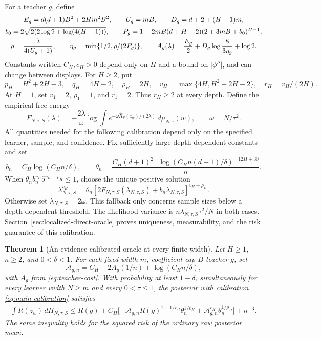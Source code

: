 \documentclass[11pt]{article}
\newtheorem{theorem}{Theorem}[section]\newtheorem{lemma}[theorem]{Lemma}\newtheorem{corollary}[theorem]{Corollary}\newtheorem{proposition}[theorem]{Proposition}
\theoremstyle{remark}\newtheorem{remark}[theorem]{Remark}
\begin{document}
For a teacher $g$, define
\begin{gather}
 E_g=d(d+1)B^2+2Hm^2B^2,\qquad U_g=mB,\qquad D_g=d+2+(H-1)m,\notag\\
 b_0=2\sqrt{2(2\log9+\log(4(H+1)))},\qquad
 P_g=1+2mB(d+H+2)(2+3mB+b_0)^{H-1},\notag\\
 \rho=\frac{\lambda}{4(U_g+1)},\qquad
 \eta_g=\min\{1/2,\rho/(2P_g)\},\qquad
 A_g(\lambda)=\frac{E_g}{2}+D_g\log\frac{8}{3\eta_g}+\log2.
 \label{eq:teacher-cost}
\end{gather}
Constants written $C_H,c_H>0$ depend only on $H$ and a bound on $|\phi''|$, and can change between displays. For $H\ge2$, put
\[
 p_H=H^2+2H-3,\quad q_H=4H-2,\quad
 \rho_H=2H,\quad v_H=\max\{4H,H^2+2H-2\},\quad r_H=v_H/(2H).
\]
At $H=1$, set $v_1=2$, $\rho_1=1$, and $r_1=2$. Thus $r_H\ge2$ at every depth. Define the empirical free energy
\[
 F_{N,\tau,S}(\lambda)=-\frac{2\lambda}{\omega}
 \log\int e^{-\omega\widehat R_S(z_w)/(2\lambda)}\,d\mu_{N,\tau}(w),
 \qquad \omega=N/\tau^2.
\]
All quantities needed for the following calibration depend only on the specified learner, sample, and confidence. Fix sufficiently large depth-dependent constants and set
\[
 b_n=C_H\log(C_Hn/\delta),\qquad
 \theta_n=\frac{C_H(d+1)^2[\log(C_Hn(d+1)/\delta)]^{12H+30}}n.
\]
When $\theta_n b_n^{v_H}5^{v_H-\rho_H}\le1$, choose the unique positive solution
\begin{equation}
 \lambda_{N,\tau,S}^{v_H}
 =\theta_n[2F_{N,\tau,S}(\lambda_{N,\tau,S})+
                  b_n\lambda_{N,\tau,S}]^{v_H-\rho_H}.
 \label{eq:main-calibration}
\end{equation}
Otherwise set $\lambda_{N,\tau,S}=2\omega$. This fallback only concerns sample sizes below a depth-dependent threshold. The likelihood variance is $n\lambda_{N,\tau,S}\tau^2/N$ in both cases. Section~\ref{sec:localized-direct-oracle} proves uniqueness, measurability, and the risk guarantee of this calibration.

\begin{theorem}[An evidence-calibrated oracle at every finite width]
\label{thm:main}
Let $H\ge1$, $n\ge2$, and $0<\delta<1$. For each fixed width-$m$, coefficient-cap-$B$ teacher $g$, set
\[
 \mathcal A_{g,n}=C_H+2A_g(1/n)+\log(C_Hn/\delta),
\]
with $A_g$ from \eqref{eq:teacher-cost}. With probability at least $1-\delta$, simultaneously for every learner width $N\ge m$ and every $0<\tau\le1$, the posterior with calibration \eqref{eq:main-calibration} satisfies
\begin{align}
 \int R(z_w)\,d\Pi_{N,\tau,S}
 \le R(g)+C_H\big[&\mathcal A_{g,n}
           R(g)^{1-1/r_H}\theta_n^{1/v_H}
       +\mathcal A_{g,n}^{r_H}\theta_n^{1/\rho_H}\big]+n^{-3}.
 \label{eq:main-oracle}
\end{align}
The same inequality holds for the squared risk of the ordinary raw posterior mean.
\end{theorem}
\end{document}
